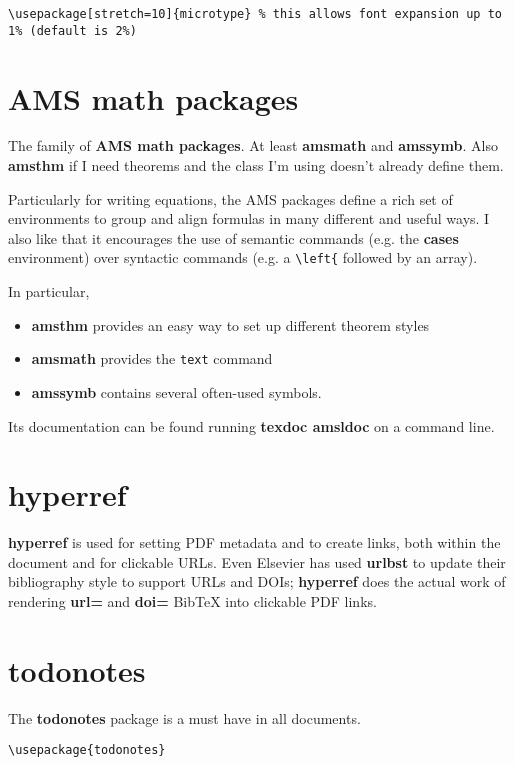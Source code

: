 \begin{lstlisting}[language={[LaTeX]TeX}]
\usepackage[stretch=10]{microtype} % this allows font expansion up to 1% (default is 2%)
\end{lstlisting}

\section{AMS math packages}
The family of \textbf{AMS math packages}. At least \textbf{amsmath} and \textbf{amssymb}. Also \textbf{amsthm} if I need theorems and the class I'm using doesn't already define them.

Particularly for writing equations, the AMS packages define a rich set of environments to group and align formulas in many different and useful ways. I also like that it encourages the use of semantic commands (e.g. the \textbf{cases} environment) over syntactic commands (e.g. a \lstinline[language={[LaTeX]TeX}]|\left{| followed by an array).

In particular, \begin{itemize}
	\item \textbf{amsthm} provides an easy way to set up different theorem styles
	\item \textbf{amsmath} provides the \lstinline[language={[LaTeX]TeX}]|text| command
	\item \textbf{amssymb} contains several often-used symbols.
\end{itemize}

Its documentation can be found running \textbf{texdoc amsldoc} on a command line.

\section{hyperref}
\textbf{hyperref} is used for setting PDF metadata and to create links, both within the document and for clickable URLs. Even Elsevier has used \textbf{urlbst} to update their bibliography style to support URLs and DOIs; \textbf{hyperref} does the actual work of rendering \textbf{url=} and \textbf{doi=} BibTeX into clickable PDF links.

\section{todonotes}
The \textbf{todonotes} package is a must have in all documents.

\begin{lstlisting}[language={[LaTeX]TeX}]
\usepackage{todonotes}
\end{lstlisting}

